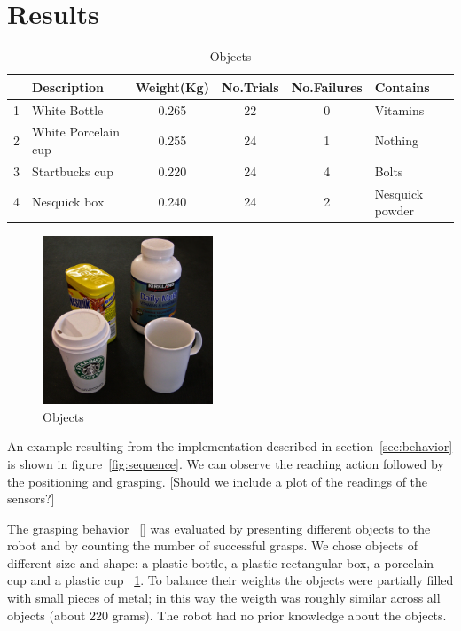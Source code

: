 \section{Results}
\label{sec:results}

\begin{table}[tb]
  \caption{Objects} \label{tab:objects} \centering
  \begin{tabular}{|c|l|c|c|c|l|}
    \hline
    &Description& Weight(Kg)&No.Trials&No.Failures&Contains \\
    \hline
    1&White Bottle        & 0.265 & 22& 0 & Vitamins\\
    2&White Porcelain cup & 0.255 & 24& 1 & Nothing\\
    3&Startbucks cup      & 0.220 & 24& 4 & Bolts \\
    4&Nesquick box        & 0.240 & 24& 2 & Nesquick powder\\

    \hline
  \end{tabular}
\end{table}

\begin{figure}[tbp]
\centerline{
\includegraphics[width=2.0in]{./figures/objects.eps}
}\caption{Objects}
\label{fig:Objects}
\end{figure}

An example resulting from the implementation described in
section~\ref{sec:behavior} is shown in figure~\ref{fig:sequence}.
We can observe the reaching action followed by the positioning and
grasping. [Should we include a plot of the readings of the
sensors?]


The grasping behavior ~\ref{} was evaluated by presenting different 
objects to the robot and by counting the number of successful grasps. 
We chose objects of different size and shape: 
a plastic bottle, a plastic rectangular box, a porcelain cup 
and a plastic cup ~\ref{fig:Objects}. To balance their weights 
the objects were partially filled with small pieces of metal; in this way the 
weigth was roughly similar across all objects (about 220 grams). 
The robot had no prior knowledge about the objects.

